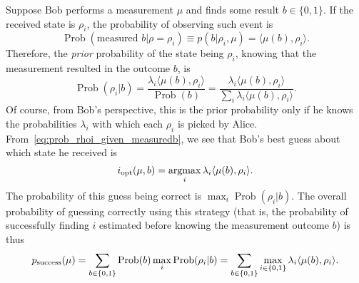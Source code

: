 \documentclass[a4paper]{report}
\DeclareMathOperator{\Prob}{Prob}
\DeclareMathOperator*{\argmax}{argmax}
\begin{document}
Suppose Bob performs a measurement $\mu$ and finds some result $b\in\{0,1\}$.
If the received state is $\rho_i$, the probability of observing such event is
\begin{equation}
	\Prob(\text{measured }b | \rho=\rho_i)
	\equiv p(b | \rho_i,\mu)
	= \langle \mu(b), \rho_i\rangle.
\end{equation}
Therefore, the \emph{prior} probability of the state being $\rho_i$, knowing that the measurement resulted in the outcome $b$, is
\begin{equation}
	\Prob(\rho_i | b)
	= \frac{\lambda_i \langle \mu(b),\rho_i\rangle}{\Prob(b)}
	= \frac{\lambda_i \langle \mu(b),\rho_i\rangle}{\sum_i \lambda_i \langle \mu(b),\rho_i\rangle}.
	\label{eq:prob_rhoi_given_measuredb}
\end{equation}
Of course, from Bob's perspective, this is the prior probability only if he knows the probabilities $\lambda_i$ with which each $\rho_i$ is picked by Alice.
From~\cref{eq:prob_rhoi_given_measuredb}, we see that Bob's best guess about which state he received is
\begin{equation}
	i_{\rm opt}(\mu,b) = \argmax_i \lambda_i \langle\mu(b),\rho_i\rangle.
\end{equation}
The probability of this guess being correct is
$\max_i\Prob(\rho_i|b)$.
The overall probability of guessing correctly using this strategy (that is, the probability of successfully finding $i$ estimated before knowing the measurement outcome $b$) is thus
\begin{equation}
	p_{\rm success}(\mu)
	= \sum_{b\in\{0,1\}}
	\Prob(b)
	\max_i \Prob(\rho_i | b)
	= \sum_{b\in\{0,1\}}
	\max_{i\in\{0,1\}}
	\lambda_i \langle\mu(b),\rho_i\rangle.
\end{equation}
\end{document}
